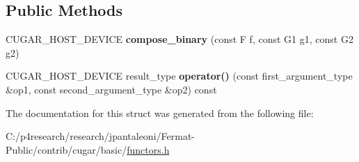 \subsection*{Public Methods}
\begin{DoxyCompactItemize}
\item 
\mbox{\label{structcugar_1_1compose__binary_ac5d7be1ab8894f7dacce1013995509a7}} 
C\+U\+G\+A\+R\+\_\+\+H\+O\+S\+T\+\_\+\+D\+E\+V\+I\+CE {\bfseries compose\+\_\+binary} (const F f, const G1 g1, const G2 g2)
\item 
\mbox{\label{structcugar_1_1compose__binary_a82bd71ce4af43bafa5f651c258cdbc8c}} 
C\+U\+G\+A\+R\+\_\+\+H\+O\+S\+T\+\_\+\+D\+E\+V\+I\+CE result\+\_\+type {\bfseries operator()} (const first\+\_\+argument\+\_\+type \&op1, const second\+\_\+argument\+\_\+type \&op2) const
\end{DoxyCompactItemize}


The documentation for this struct was generated from the following file\+:\begin{DoxyCompactItemize}
\item 
C\+:/p4research/research/jpantaleoni/\+Fermat-\/\+Public/contrib/cugar/basic/\hyperlink{functors_8h}{functors.\+h}\end{DoxyCompactItemize}
